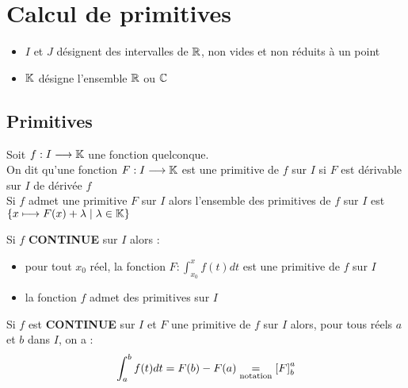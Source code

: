 \chapter{Calcul de primitives}

\minitoc
\begin{nota}
    \begin{itemize}
        \item \(I\) et \(J\) désignent des intervalles de \(\mathbb{R}\), non vides et non réduits à un point
        \item \(\mathbb{K}\) désigne l'ensemble \(\mathbb{R}\) ou \(\mathbb{C}\)
    \end{itemize}
\end{nota}

\section{Primitives}

\begin{defprop}
    Soit \(f:I\longrightarrow\mathbb{K}\) une fonction quelconque. \\
    On dit qu'une fonction \(F:I\longrightarrow\mathbb{K}\) est une primitive de \(f\) sur \(I\) si \(F\) est dérivable sur \(I\) de dérivée \(f\) \\
    Si \(f\) admet une primitive \(F\) sur \(I\) alors l'ensemble des primitives de \(f\) sur \(I\) est \(\left\lbrace x\longmapsto F(x)+ \lambda \;\middle|\; \lambda \in \mathbb{K}\right\rbrace\)
\end{defprop}

\begin{theo}
    Si \(f\) \textbf{CONTINUE} sur \(I\) alors : 
    \begin{itemize}
        \item pour tout \(x_0\) réel, la fonction \(F:\int_{x_0}^{x} f(t) dt\) est une primitive de \(f\) sur \(I\)
        \item la fonction \(f\) admet des primitives sur \(I\)
    \end{itemize}
\end{theo}

\begin{defprop}
    Si \(f\) est \textbf{CONTINUE} sur \(I\) et \(F\) une primitive de \(f\) sur \(I\) alors, pour tous réels \(a\) et \(b\) dans \(I\), on a :
    \[\int_{a}^b f(t) dt = F(b)-F(a) \underset{\mathrm{notation}}{=} \left[F\right]^a_b \]
\end{defprop}

